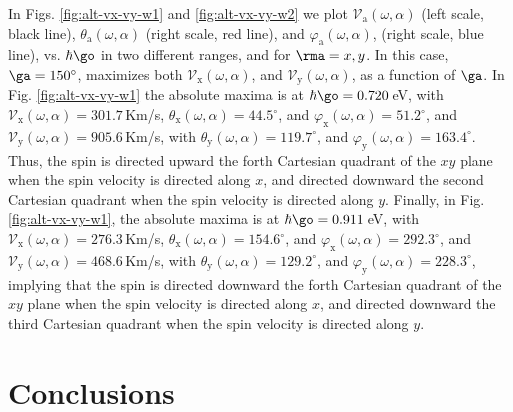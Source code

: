 \documentclass[floatfix,prb,aps,superscriptaddress,showpacs,11pt,preprint,letterpaper]{revtex4}
\begin{document}
In Figs. \ref{fig:alt-vx-vy-w1} and \ref{fig:alt-vx-vy-w2} we plot
$\mathcal{V}_{\mathrm{a}} (\omega,\alpha)$ (left scale, black line),
$\theta_{\mathrm{a}} (\omega,\alpha)$ (right scale, red line), and
$\varphi_{\mathrm{a}} (\omega,\alpha)$, (right scale, blue line), vs.
$\hbar\go$ in two different ranges, and  for $\rma=x,y$. In this case,
$\ga=150^\circ$,  maximizes both $\mathcal{V}_{\mathrm{x}} (\omega,\alpha)$,
and $\mathcal{V}_{\mathrm{y}} (\omega,\alpha)$, as a function of $\ga$.
% 
In Fig. \ref{fig:alt-vx-vy-w1} the absolute maxima is at
$\hbar\go=0.720$\,eV, with $\mathcal{V}_{\mathrm{x}}
(\omega,\alpha) = 301.7$\,Km/s, $\theta_{\mathrm{x}} (\omega,\alpha) =
44.5^{\circ}$, and $\varphi_{\mathrm{x}}(\omega,\alpha) = 51.2^{\circ}$,
and $\mathcal{V}_{\mathrm{y}} (\omega,\alpha) = 905.6$\,Km/s, with
$\theta_{\mathrm{y}} (\omega,\alpha) = 119.7^{\circ}$, and
$\varphi_{\mathrm{y}}(\omega,\alpha) = 163.4^{\circ}$. 
% 
Thus, the spin is directed upward the forth Cartesian quadrant of the $xy$
plane when the spin velocity is directed along $x$, and directed downward the
second Cartesian quadrant when the spin velocity is directed along $y$.
% 
Finally, in  Fig. \ref{fig:alt-vx-vy-w1}, the absolute maxima is at
$\hbar\go=0.911$\,eV, with $\mathcal{V}_{\mathrm{x}} (\omega,\alpha) =
276.3$\,Km/s, $\theta_{\mathrm{x}} (\omega,\alpha) = 154.6^{\circ}$, and
$\varphi_{\mathrm{x}}(\omega,\alpha) = 292.3^{\circ}$, and
$\mathcal{V}_{\mathrm{y}} (\omega,\alpha) = 468.6$\,Km/s, with
$\theta_{\mathrm{y}} (\omega,\alpha) = 129.2^{\circ}$, and
$\varphi_{\mathrm{y}}(\omega,\alpha) = 228.3^{\circ}$, implying that the spin
is directed downward the forth Cartesian quadrant of the $xy$ plane when the
spin velocity is directed along $x$, and directed downward the third Cartesian
quadrant when the spin velocity is directed along $y$.

\section{Conclusions} %
\label{sec:conclusions}
\end{document}
